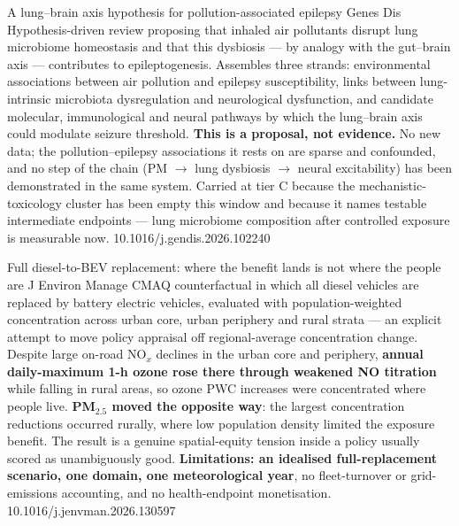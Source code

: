 \documentclass[10pt]{article}
\begin{document}
{A lung--brain axis hypothesis for pollution-associated epilepsy}
{Genes Dis}
{Hypothesis-driven review proposing that inhaled air pollutants disrupt lung microbiome
homeostasis and that this dysbiosis --- by analogy with the gut--brain axis --- contributes
to epileptogenesis. Assembles three strands: environmental associations between air
pollution and epilepsy susceptibility, links between lung-intrinsic microbiota
dysregulation and neurological dysfunction, and candidate molecular, immunological and
neural pathways by which the lung--brain axis could modulate seizure threshold.
\textbf{This is a proposal, not evidence.} No new data; the pollution--epilepsy
associations it rests on are sparse and confounded, and no step of the chain
(PM $\to$ lung dysbiosis $\to$ neural excitability) has been demonstrated in the same
system. Carried at tier C because the mechanistic-toxicology cluster has been empty this
window and because it names testable intermediate endpoints --- lung microbiome
composition after controlled exposure is measurable now.}
{10.1016/j.gendis.2026.102240}


{Full diesel-to-BEV replacement: where the benefit lands is not where the people are}
{J Environ Manage}
{CMAQ counterfactual in which all diesel vehicles are replaced by battery electric
vehicles, evaluated with population-weighted concentration across urban core, urban
periphery and rural strata --- an explicit attempt to move policy appraisal off
regional-average concentration change. Despite large on-road NO$_x$ declines in the urban
core and periphery, \textbf{annual daily-maximum 1-h ozone rose there through weakened NO
titration} while falling in rural areas, so ozone PWC increases were concentrated where
people live. \textbf{PM$_{2.5}$ moved the opposite way}: the largest concentration
reductions occurred rurally, where low population density limited the exposure benefit.
The result is a genuine spatial-equity tension inside a policy usually scored as
unambiguously good. \textbf{Limitations: an idealised full-replacement scenario, one
domain, one meteorological year}, no fleet-turnover or grid-emissions accounting, and no
health-endpoint monetisation.}
{10.1016/j.jenvman.2026.130597}
\end{document}
